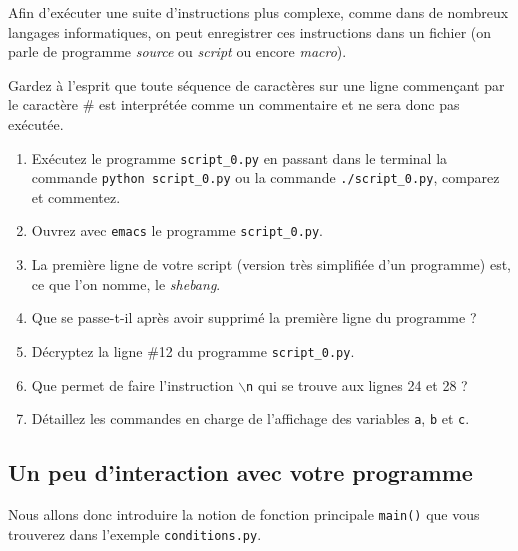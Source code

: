 Afin d'exécuter  une suite  d'instructions plus complexe,  comme dans
de nombreux langages  informatiques, on  peut enregistrer  ces
instructions  dans un fichier (on parle de programme \emph{source}
ou \emph{script} ou encore \emph{macro}).

Gardez à l'esprit  que toute séquence de caractères sur une ligne
commençant par le caractère \#  est interprétée comme un commentaire
et ne sera donc pas exécutée.

\begin{enumerate}
\item Exécutez  le programme \texttt{script\_0.py} en  passant dans le
  terminal  la commande  \texttt{python script\_0.py}  ou la  commande
  \texttt{./script\_0.py}, comparez et commentez.

\item Ouvrez avec \texttt{emacs} le programme \texttt{script\_0.py}.

\item La première ligne de  votre script (version très simplifiée d'un
  programme) est, ce que l'on nomme, le \emph{shebang}.

\item Que  se passe-t-il après  avoir supprimé  la première  ligne du
  programme ?

\item Décryptez la ligne \#12 du programme \texttt{script\_0.py}.

\item Que permet de  faire l'instruction \texttt{$\backslash$n} qui se
  trouve aux lignes 24 et 28 ?

\item Détaillez les commandes en  charge de l'affichage des variables
  \texttt{a}, \texttt{b} et \texttt{c}.


\end{enumerate}




\subsection{Un peu d'interaction avec votre programme}



Nous  allons donc  introduire  la  notion de  fonction
principale   \texttt{main()}  que   vous   trouverez  dans   l'exemple
\texttt{conditions.py}.

